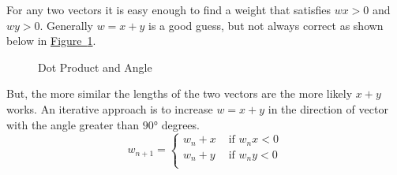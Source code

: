 For any two vectors it is easy enough to find a weight that satisfies \( wx > 0 \) and \( wy > 0 \).
Generally \( w = x + y \) is a good guess, but not always correct as shown below in
\hyperref[fig:vectorangle]{Figure~\ref*{fig:vectorangle}}.

\bigskip
\begin{figure}[H]
    \centering
    \plotvectorangle{}
    \caption{Dot Product and Angle}\label{fig:vectorangle}
\end{figure}
\bigskip

But, the more similar the lengths of the two vectors are the more likely \( x + y \) works.
An iterative approach is to increase \( w = x + y \) in the direction of vector with the angle greater
than \( \ang{90} \) degrees.
\[
    w_{n + 1} = \left \{
    \begin{array}{ll}
        w_n + x & \text{ if } w_n x < 0 \\
        w_n + y & \text{ if } w_n y < 0 \\
    \end{array}
    \right.
\]
\bigskip


